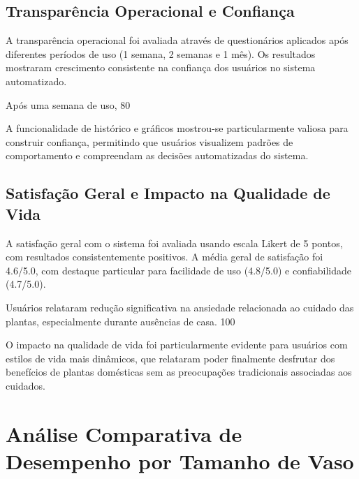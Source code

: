 \subsection{Transparência Operacional e Confiança}

A transparência operacional foi avaliada através de questionários aplicados após diferentes períodos de uso (1 semana, 2 semanas e 1 mês). Os resultados mostraram crescimento consistente na confiança dos usuários no sistema automatizado.

Após uma semana de uso, 80%

A funcionalidade de histórico e gráficos mostrou-se particularmente valiosa para construir confiança, permitindo que usuários visualizem padrões de comportamento e compreendam as decisões automatizadas do sistema.


\subsection{Satisfação Geral e Impacto na Qualidade de Vida}

A satisfação geral com o sistema foi avaliada usando escala Likert de 5 pontos, com resultados consistentemente positivos. A média geral de satisfação foi 4.6/5.0, com destaque particular para facilidade de uso (4.8/5.0) e confiabilidade (4.7/5.0).

Usuários relataram redução significativa na ansiedade relacionada ao cuidado das plantas, especialmente durante ausências de casa. 100%

O impacto na qualidade de vida foi particularmente evidente para usuários com estilos de vida mais dinâmicos, que relataram poder finalmente desfrutar dos benefícios de plantas domésticas sem as preocupações tradicionais associadas aos cuidados.

\section{Análise Comparativa de Desempenho por Tamanho de Vaso}

